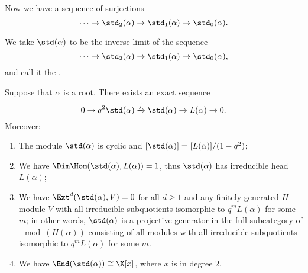 Now we have a sequence of surjections $$\cdots\to
\std_2(\alpha)\to\std_1(\alpha)\to\std_0(\alpha).$$

\begin{definition}
    We take $\std(\alpha)$ to be the inverse limit of the sequence
    \[
        \cdots\to\std_2(\alpha)\to\std_1(\alpha)\to\std_0(\alpha),
    \]
    and call it the .
\end{definition}

\begin{proposition}\label{root-module}
    Suppose that $\alpha$ is a root.
    There exists an exact sequence \begin{equation}\label{exact-3}
        0\to q^2\std(\alpha)\xrightarrow{j}\std(\alpha)\to L(\alpha)\to 0.
    \end{equation}
    Moreover:\begin{enumerate}[1)]
        \item The module $\std(\alpha)$ is cyclic
        and $[\std(\alpha)] = [L(\alpha)]/(1-q^2)$;
        \item We have $\Dim\Hom(\std(\alpha),L(\alpha)) = 1$, 
        thus $\std(\alpha)$ has irreducible head $L(\alpha)$;
        \item We have $\Ext^d(\std(\alpha),V) = 0$ for all $d\ge 1$ and any finitely
        generated $H$-module $V$ with all irreducible subquotients isomorphic
        to $q^mL(\alpha)$ for some $m$; in other words,
        $\std(\alpha)$ is a projective generator in the
        full subcategory of $\mod(H(\alpha))$ consisting of
        all modules with all irreducible subquotients isomorphic
        to $q^mL(\alpha)$ for some $m$.
        \item We have $\End(\std(\alpha))\cong\K[x]$, where $x$ is in degree $2$.
    \end{enumerate}
\end{proposition}

